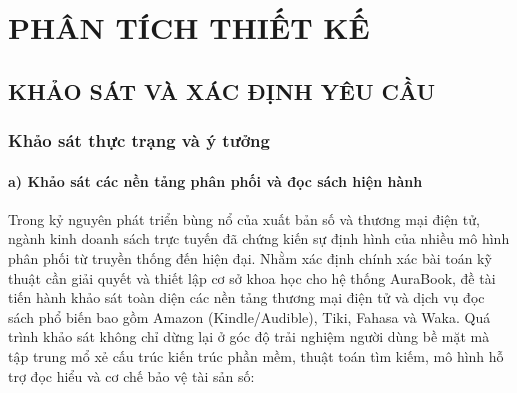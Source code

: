 \documentclass[11pt, a4paper]{report}
\begin{document}
\chapter{PHÂN TÍCH THIẾT KẾ}

\section{KHẢO SÁT VÀ XÁC ĐỊNH YÊU CẦU}

\subsection{Khảo sát thực trạng và ý tưởng}

\subsubsection{a) Khảo sát các nền tảng phân phối và đọc sách hiện hành}

Trong kỷ nguyên phát triển bùng nổ của xuất bản số và thương mại điện tử, ngành kinh doanh sách trực tuyến đã chứng kiến sự định hình của nhiều mô hình phân phối từ truyền thống đến hiện đại. Nhằm xác định chính xác bài toán kỹ thuật cần giải quyết và thiết lập cơ sở khoa học cho hệ thống AuraBook, đề tài tiến hành khảo sát toàn diện các nền tảng thương mại điện tử và dịch vụ đọc sách phổ biến bao gồm Amazon (Kindle/Audible), Tiki, Fahasa và Waka. Quá trình khảo sát không chỉ dừng lại ở góc độ trải nghiệm người dùng bề mặt mà tập trung mổ xẻ cấu trúc kiến trúc phần mềm, thuật toán tìm kiếm, mô hình hỗ trợ đọc hiểu và cơ chế bảo vệ tài sản số:
\end{document}

